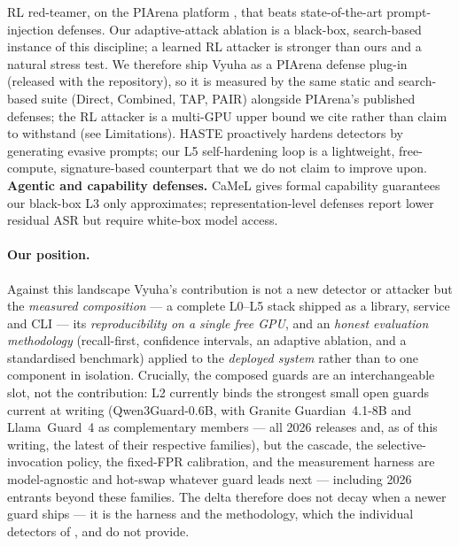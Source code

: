\documentclass[11pt]{article}
\begin{document}
RL red-teamer, on the PIArena platform \citep{piarena}, that beats state-of-the-art prompt-injection
defenses. Our adaptive-attack ablation is a black-box, search-based instance of this discipline; a
learned RL attacker is stronger than ours and a natural stress test. We therefore ship Vyuha as a
PIArena defense plug-in (released with the repository), so it is measured by the same static and search-based suite
(Direct, Combined, TAP, PAIR) alongside PIArena's published defenses; the RL attacker is a multi-GPU
upper bound we cite rather than claim to withstand (see Limitations). HASTE \citep{haste} proactively hardens detectors by generating
evasive prompts; our L5 self-hardening loop is a lightweight, free-compute, signature-based counterpart
that we do not claim to improve upon.
\textbf{Agentic and capability defenses.} CaMeL \citep{camel} gives formal capability guarantees our
black-box L3 only approximates; representation-level defenses report lower residual ASR but require
white-box model access.

\paragraph{Our position.} Against this landscape Vyuha's contribution is not a new detector or attacker
but the \emph{measured composition} --- a complete L0--L5 stack shipped as a library, service and CLI ---
its \emph{reproducibility on a single free GPU}, and an \emph{honest evaluation methodology} (recall-first,
confidence intervals, an adaptive ablation, and a standardised benchmark) applied to the \emph{deployed
system} rather than to one component in isolation. Crucially, the composed guards are an interchangeable
slot, not the contribution: L2 currently binds the strongest small open guards current at writing
(Qwen3Guard-0.6B, with Granite Guardian~4.1-8B and Llama~Guard~4 as complementary members --- all 2026
releases and, as of this writing, the latest of their respective families), but the cascade, the
selective-invocation policy, the fixed-FPR calibration, and the measurement harness are model-agnostic
and hot-swap whatever guard leads next --- including 2026 entrants beyond these families. The delta
therefore does not decay when a newer guard ships --- it is the harness and
the methodology, which the individual detectors of \citet{promptshield}, \citet{pismith} and
\citet{haste} do not provide.
\end{document}
